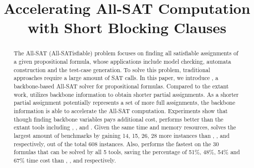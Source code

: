 \documentclass{article}
\begin{document}
\title{Accelerating All-SAT Computation with Short Blocking Clauses }
\maketitle
\begin{abstract}
The All-SAT (All-SATisfiable) problem focuses on finding all satisfiable assignments of a given propositional formula, whose applications include model checking, automata construction and the test-case generation. To solve this problem, traditional approaches require a large amount of SAT calls.
In this paper, we introduce \tool, a backbone-based All-SAT solver for propositional formulas. Compared to the extant work, \tool utilizes backbone information to obtain shorter partial assignments. As a shorter partial assignment potentially represents a set of more full assignments, the backbone information is able to accelerate the All-SAT computation. 
Experiments show that though finding backbone variables pays additional cost, \tool performs better than the extant tools including \ctool, \bc, \nbc and \bdd.
Given the same time and memory resources, \tool solves the largest amount of benchmarks by gaining 14, 15, 26, 28 more instances than \ctool, \bc, \nbc and \bdd respectively, out of the total 608 instances.
Also, \tool performs the fastest on the 30 formulas that can be solved by all 5 tools, saving the percentage of 51\%, 48\%, 54\% and 67\% time cost than \ctool, \bc, \nbc and \bdd respectively.
\end{abstract}








\end{document}
